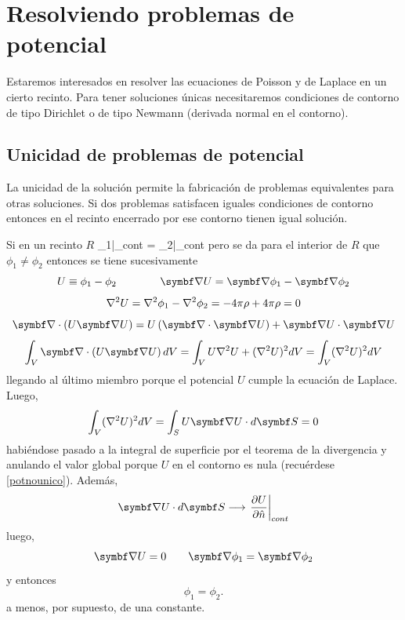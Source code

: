 \documentclass[10pt,oneside]{CBFT_book}
\begin{document}
\section{Resolviendo problemas de potencial}

Estaremos interesados en resolver las ecuaciones de Poisson y de Laplace en un cierto recinto.
Para tener soluciones únicas necesitaremos condiciones de contorno de tipo Dirichlet o de tipo Newmann (derivada
normal en el contorno).


\subsection{Unicidad de problemas de potencial}

La unicidad de la solución permite la fabricación de problemas equivalentes para otras soluciones.
Si dos problemas satisfacen iguales condiciones de contorno entonces en el recinto encerrado por
ese contorno tienen igual solución.

Si en un recinto $R$
\be
	\phi_1|_{cont} = \phi_2|_{cont}
	\label{potnounico}
\ee
pero se da para el interior de $R$ que $\phi_1\neq\phi_2$ entonces se tiene sucesivamente
\[
	U \equiv \phi_1 - \phi_2 \qquad \qquad \Nabla U = \Nabla \phi_1 - \Nabla \phi_2
\]
\[
	\nabla^2{U} = \nabla^2{\phi_1} - \nabla^2{\phi_2} = -4\pi \rho + 4\pi\rho = 0
\]
\[
	\Nabla\cdot\left( U\Nabla U \right) = U\left( \Nabla\cdot\Nabla U \right) + \Nabla U \cdot \Nabla U
\]
\[
	\int_V \Nabla\cdot\left( U\Nabla U \right) dV = 
	\int_V U \lapm{U}  + (\lapm{U})^2 dV =  \int_V (\lapm{U})^2 dV
\]
llegando al último miembro porque el potencial $U$ cumple la ecuación de Laplace. Luego,
\[
	\int_V (\lapm{U})^2 dV = \int_S U\Nabla{U} \cdot d\vb{S} = 0
\]
habiéndose pasado a la integral de superficie por el teorema de la divergencia y anulando 
el valor global porque 
$U$ en el contorno es nula (recuérdese \eqref{potnounico}). Además, 
\[
	\Nabla{U} \cdot d\vb{S}  \longrightarrow \left.\dpar{U}{\hat{n}}\right|_{cont}
\]
luego,
\[
	\Nabla U = 0 \qquad \Nabla\phi_1 = \Nabla\phi_2 
\]
y entonces
\[
	\phi_1 = \phi_2 .
\]
a menos, por supuesto, de una constante.

\end{document}

